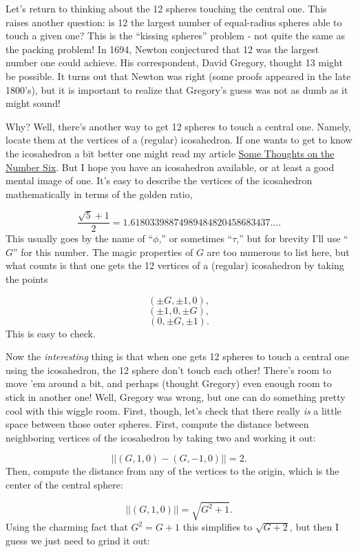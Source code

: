 Let's return to thinking about the 12 spheres touching the central one. This raises another question: is 12 the largest number of equal-radius spheres able to touch a given one? This is the ``kissing spheres'' problem - not quite the same as the packing problem! In 1694, Newton conjectured that 12 was the largest number one could achieve. His correspondent, David Gregory, thought 13 might be possible. It turns out that Newton was right (some proofs appeared in the late 1800's), but it is important to realize that Gregory's guess was not as dumb as it might sound!

Why? Well, there's another way to get 12 spheres to touch a central one. Namely, locate them at the vertices of a (regular) icosahedron. If one wants to get to know the icosahedron a bit better one might read my article \href{http://math.ucr.edu/home/baez/six.html}{Some Thoughts on the Number Six}. But I hope you have an icosahedron available, or at least a good mental image of one. It's easy to describe the vertices of the icosahedron mathematically in terms of the golden ratio,

\[ \frac{\sqrt{5} + 1}{2} = 1.61803398874989484820458683437....\]
This usually goes by the name of ``$\phi$,'' or sometimes ``$\tau$,'' but for brevity I'll use ``$G$'' for this number. The magic properties of $G$ are too numerous to list here, but what counts is that one gets the 12 vertices of a (regular) icosahedron by taking the points

\[                (\pm G, \pm 1, 0),\]
\[                (\pm 1, 0, \pm G),\]
\[                (0, \pm G, \pm 1).\]
This is easy to check.

Now the \emph{interesting} thing is that when one gets 12 spheres to touch a central one using the icosahedron, the 12 sphere don't touch each other! There's room to move 'em around a bit, and perhaps (thought Gregory) even enough room to stick in another one! Well, Gregory was wrong, but one can do something pretty cool with this wiggle room. First, though, let's check that there really \emph{is} a little space between those outer spheres. First, compute the distance between neighboring vertices of the icosahedron by taking two and working it out:

\[               ||(G,1,0) - (G,-1,0)|| = 2.\]
Then, compute the distance from any of the vertices to the origin, which is the center of the central sphere:

\[               ||(G,1,0)|| = \sqrt{G^2 + 1}.\]
Using the charming fact that $G^2 = G + 1$ this simplifies to $\sqrt{G + 2}$, but then I guess we just need to grind it out:

